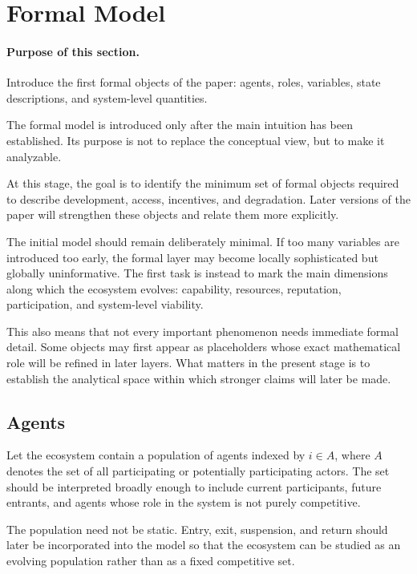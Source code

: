 \documentclass[11pt]{article}
\begin{document}
\section{Formal Model}

\paragraph{Purpose of this section.}
Introduce the first formal objects of the paper: agents, roles, variables, state descriptions, and system-level quantities.

The formal model is introduced only after the main intuition has been established. Its purpose is not to replace the conceptual view, but to make it analyzable.

At this stage, the goal is to identify the minimum set of formal objects required to describe development, access, incentives, and degradation. Later versions of the paper will strengthen these objects and relate them more explicitly.

The initial model should remain deliberately minimal. If too many variables are introduced too early, the formal layer may become locally sophisticated but globally uninformative. The first task is instead to mark the main dimensions along which the ecosystem evolves: capability, resources, reputation, participation, and system-level viability.

This also means that not every important phenomenon needs immediate formal detail. Some objects may first appear as placeholders whose exact mathematical role will be refined in later layers. What matters in the present stage is to establish the analytical space within which stronger claims will later be made.

\subsection{Agents}

Let the ecosystem contain a population of agents indexed by \(i \in A\), where \(A\) denotes the set of all participating or potentially participating actors. The set should be interpreted broadly enough to include current participants, future entrants, and agents whose role in the system is not purely competitive.

The population need not be static. Entry, exit, suspension, and return should later be incorporated into the model so that the ecosystem can be studied as an evolving population rather than as a fixed competitive set.
\end{document}
